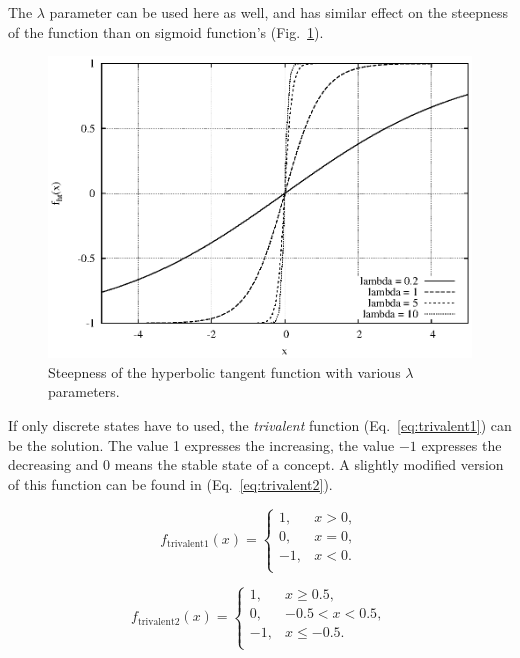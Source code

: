 \documentclass[graybox]{svmult}
\begin{document}
The $\lambda$ parameter can be used here as well, and has similar effect on the steepness of the function than on sigmoid function's (Fig.~\ref{fig:lambdaHT}).

\begin{figure}[hbt]
  \begin{center}
    \includegraphics[scale=.8]{lambdaHT.eps}
  \end{center}
  \caption{Steepness of the hyperbolic tangent function with various $\lambda$ parameters.}
  \label{fig:lambdaHT}
\end{figure}

If only discrete states have to used, the \emph{trivalent} function (Eq.~\ref{eq:trivalent1}) can be the solution. The value 1 expresses the increasing, the value $-1$ expresses the decreasing and 0 means the stable state of a concept. A slightly modified version of this function can be found in \cite{yesil2014fcm} (Eq.~\ref{eq:trivalent2}).

\begin{equation}
\label{eq:trivalent1}
f_{\textrm{trivalent1}}(x) = \left\{
\begin{array}{ll}
1, & x>0, \\
0, & x=0, \\
-1,& x<0. \\
\end{array}
\right.
\end{equation}

\begin{equation}
\label{eq:trivalent2}
f_{\textrm{trivalent2}}(x) = \left\{
\begin{array}{ll}
1, & x \geq 0.5, \\
0, & -0.5 < x < 0.5, \\
-1,& x \leq -0.5. \\
\end{array}
\right.
\end{equation}
\end{document}
